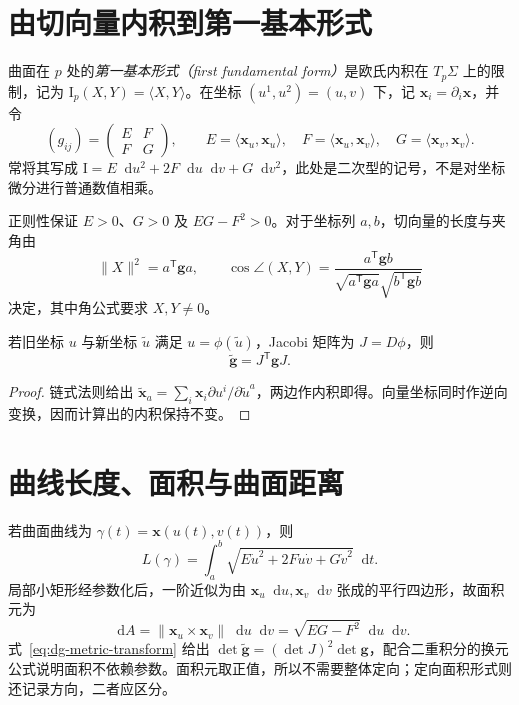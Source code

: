 \documentclass[UTF8,12pt,a4paper,fontset=fandol]{ctexbook}
\newcommand{\dd}{\mathop{}\!\mathrm d}
\newcommand{\ip}[2]{\langle #1,#2\rangle}
\newcommand{\norm}[1]{\lVert #1\rVert}
\begin{document}
\section{由切向量内积到第一基本形式}
\begin{definition}[第一基本形式]
曲面在 $p$ 处的\emph{第一基本形式（first fundamental form）}是欧氏内积在 $T_p\Sigma$ 上的限制，记为 $\mathrm I_p(X,Y)=\ip XY$。在坐标 $(u^1,u^2)=(u,v)$ 下，记 $\mathbf x_i=\partial_i\mathbf x$，并令
\[
 (g_{ij})=\begin{pmatrix}E&F\\F&G\end{pmatrix},\qquad
 E=\ip{\mathbf x_u}{\mathbf x_u},\quad
 F=\ip{\mathbf x_u}{\mathbf x_v},\quad
 G=\ip{\mathbf x_v}{\mathbf x_v}.
\]
常将其写成 $\mathrm I=E\dd u^2+2F\dd u\dd v+G\dd v^2$，此处是二次型的记号，不是对坐标微分进行普通数值相乘。
\end{definition}
正则性保证 $E>0$、$G>0$ 及 $EG-F^2>0$。对于坐标列 $a,b$，切向量的长度与夹角由
\[
 \norm X^2=a^{\mathsf T}\mathbf g a,\qquad
 \cos\angle(X,Y)=\frac{a^{\mathsf T}\mathbf g b}
 {\sqrt{a^{\mathsf T}\mathbf g a}\sqrt{b^{\mathsf T}\mathbf g b}}
\]
决定，其中角公式要求 $X,Y\ne0$。

\begin{proposition}[度量变换律]
若旧坐标 $u$ 与新坐标 $\widetilde u$ 满足 $u=\phi(\widetilde u)$，Jacobi 矩阵为 $J=D\phi$，则
\begin{equation}
 \widetilde{\mathbf g}=J^{\mathsf T}\mathbf gJ.
 \label{eq:dg-metric-transform}
\end{equation}
\end{proposition}
\begin{proof}
链式法则给出 $\widetilde{\mathbf x}_a=\sum_i\mathbf x_i\partial u^i/\partial\widetilde u^a$，两边作内积即得。向量坐标同时作逆向变换，因而计算出的内积保持不变。
\end{proof}

\section{曲线长度、面积与曲面距离}
若曲面曲线为 $\gamma(t)=\mathbf x(u(t),v(t))$，则
\begin{equation}
 L(\gamma)=\int_a^b\sqrt{E\dot u^2+2F\dot u\dot v+G\dot v^2}\dd t.
 \label{eq:dg-surface-length}
\end{equation}
局部小矩形经参数化后，一阶近似为由 $\mathbf x_u\dd u,\mathbf x_v\dd v$ 张成的平行四边形，故面积元为
\begin{equation}
 \dd A=\norm{\mathbf x_u\times\mathbf x_v}\dd u\dd v
       =\sqrt{EG-F^2}\dd u\dd v.
 \label{eq:dg-area}
\end{equation}
式~\eqref{eq:dg-metric-transform} 给出 $\det\widetilde{\mathbf g}=(\det J)^2\det\mathbf g$，配合二重积分的换元公式说明面积不依赖参数。面积元取正值，所以不需要整体定向；定向面积形式则还记录方向，二者应区分。
\end{document}
